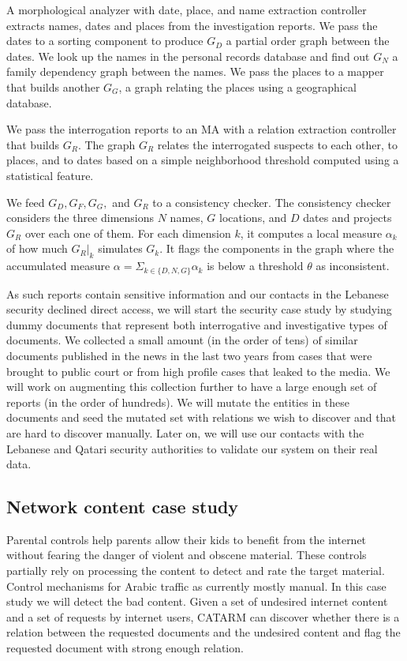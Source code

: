 \documentclass[12pt]{article}
\begin{document}
A morphological analyzer with date, place, and name extraction controller extracts
names, dates and places from the investigation reports. 
We pass the dates to a sorting component to produce $G_D$ 
a partial order graph between the dates. 
We look up the names in the personal records database and find out
$G_N$ a family dependency graph between the names. 
We pass the places to a mapper that builds another $G_G$,
a graph relating the places using a geographical database. 

We pass the interrogation reports to an MA with a relation 
extraction controller that builds $G_R$. 
The graph $G_R$ relates the interrogated suspects
to each other, to places, and to dates based on a simple
neighborhood threshold computed using a statistical feature. 

We feed $G_D, G_F, G_G,$ and $G_R$   
to a consistency checker.
The consistency checker considers the three dimensions 
$N$ names, $G$ locations, and $D$ dates and projects $G_R$
over each one of them.
For each dimension $k$, it computes a local measure 
$\alpha_k$ of how much $G_R|_k$ simulates $G_k$. 
It flags the components in the graph where the accumulated 
measure $\alpha= \Sigma_{k\in\{D,N,G\}} \alpha_k$ is
below a threshold $\theta$ as inconsistent. 

As such reports contain sensitive information and our contacts
in the Lebanese security declined direct access, 
we will start the security case study by studying dummy documents that 
represent both interrogative and investigative types of documents. 
We collected a small amount (in the order of tens)
of similar documents published in the news in the last two years
from cases that were brought to public court or from high profile
cases that leaked to the media.
We will work on augmenting this collection further to have a large
enough set of reports (in the order of hundreds). 
We will mutate the entities in these documents and seed the mutated
set with relations we wish to discover and that are hard to discover
manually. 
Later on, we will use our contacts with the Lebanese and Qatari 
security authorities
to validate our system on their real data. 

\subsection{Network content case study}
\label{s:design:net}

Parental controls help parents allow their kids to benefit from the internet 
without fearing the danger of violent and obscene material. 
These controls partially rely on processing the content to detect and rate 
the target material. 
Control mechanisms for Arabic traffic as currently mostly manual. 
In this case study we will detect the bad content. 
Given a set of undesired internet content 
and a set of requests by internet users, 
CATARM can discover whether there is a relation between 
the requested documents and the undesired content and flag the 
requested document with strong enough relation. 
\end{document}
